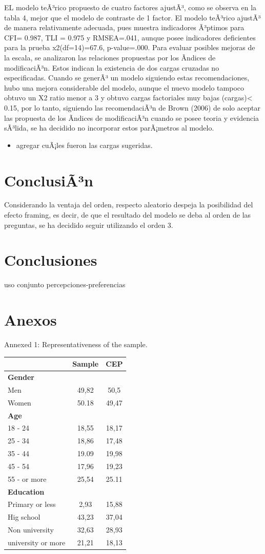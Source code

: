 \documentclass[
]{article}
\providecommand{\tightlist}{%
  \setlength{\itemsep}{0pt}\setlength{\parskip}{0pt}}
\begin{document}
EL modelo teÃ³rico propuesto de cuatro factores ajustÃ³, como se observa
en la tabla 4, mejor que el modelo de contraste de 1 factor. El modelo
teÃ³rico ajustÃ³ de manera relativamente adecuada, pues muestra
indicadores Ã³ptimos para CFI= 0.987, TLI = 0.975 y RMSEA=.041, aunque
posee indicadores deficientes para la prueba x2(df=14)=67.6,
p-value=.000. Para evaluar posibles mejoras de la escala, se analizaron
las relaciones propuestas por los Ã­ndices de modificaciÃ³n. Estos
indican la existencia de dos cargas cruzadas no especificadas. Cuando se
generÃ³ un modelo siguiendo estas recomendaciones, hubo una mejora
considerable del modelo, aunque el nuevo modelo tampoco obtuvo un X2
ratio menor a 3 y obtuvo cargas factoriales muy bajas
(cargas)\textless{} 0.15, por lo tanto, siguiendo las recomendaciÃ³n de
Brown (2006) de solo aceptar las propuesta de los Ã­ndices de
modificaciÃ³n cuando se posee teoria y evidencia sÃ³lida, se ha decidido
no incorporar estos parÃ¡metros al modelo.

\begin{itemize}
\tightlist
\item
  agregar cuÃ¡les fueron las cargas sugeridas.
\end{itemize}

\hypertarget{conclusian}{%
\section{ConclusiÃ³n}\label{conclusian}}

Considerando la ventaja del orden, respecto aleatorio despeja la
posibilidad del efecto framing, es decir, de que el resultado del modelo
se deba al orden de las preguntas, se ha decidido seguir utilizando el
orden 3.

\hypertarget{conclusiones}{%
\section{Conclusiones}\label{conclusiones}}

uso conjunto percepciones-preferencias

\hypertarget{anexos}{%
\section{Anexos}\label{anexos}}

Annexed 1: Representativeness of the sample.

\begin{longtable}[]{@{}lcc@{}}
\toprule
& Sample & CEP\tabularnewline
\midrule
\endhead
\textbf{Gender} & &\tabularnewline
Men & 49,82 & 50,5\tabularnewline
Women & 50.18 & 49,47\tabularnewline
\textbf{Age} & &\tabularnewline
18 - 24 & 18,55 & 18,17\tabularnewline
25 - 34 & 18,86 & 17,48\tabularnewline
35 - 44 & 19.09 & 19,98\tabularnewline
45 - 54 & 17,96 & 19,23\tabularnewline
55 - or more & 25,54 & 25.11\tabularnewline
\textbf{Education} & &\tabularnewline
Primary or less & 2,93 & 15,88\tabularnewline
Hig school & 43,23 & 37,04\tabularnewline
Non university & 32,63 & 28,93\tabularnewline
university or more & 21,21 & 18,13\tabularnewline
\bottomrule
\end{longtable}
\end{document}
